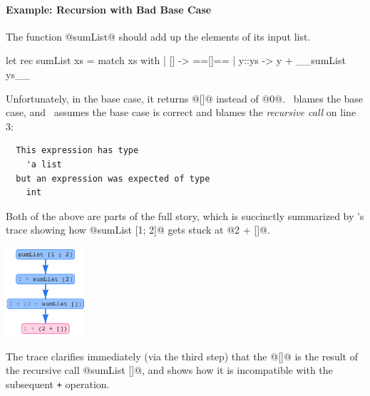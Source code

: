 \paragraph{Example: Recursion with Bad Base Case}
%
The function @sumList@ should add up
the elements of its input list.
%
\begin{ecode}
  let rec sumList xs = match xs with
    | []    -> ==[]==
    | y::ys -> y + __sumList ys__
\end{ecode}
%
Unfortunately, in the base case, it returns @[]@
instead of @0@.
%
\sherrloc\ blames the base case, and \ocaml\
assumes the base case is correct and blames
the \emph{recursive call} on line 3:
%
\begin{verbatim}
  This expression has type
    'a list
  but an expression was expected of type
    int
\end{verbatim}
%
Both of the above are parts of the full story, which
is succinctly summarized by \toolname's trace showing
how @sumList [1; 2]@ gets stuck at @2 + []@.
%
\begin{center}
  \includegraphics[height=125px]{sumlist.png}
\end{center}
%
The trace clarifies immediately (via the third step)
that the @[]@ is the result of the recursive call
@sumList []@, and shows how it is incompatible with
the subsequent \texttt{+} operation.


